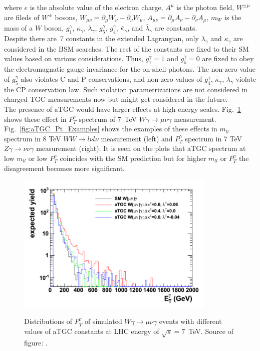 where $e$ is the absolute value of the electron charge, $A^\mu$ is the photon field, $W^{\pm\mu}$ are fileds of $W^\pm$ bosons, $W_{\mu\nu}=\partial_\mu W_\nu - \partial_\nu W_\mu$, $A_{\mu\nu}=\partial_\mu A_\nu - \partial_\nu A_\mu$, $m_W$ is the mass of a $W$ boson, $g_1^\gamma$, $\kappa_\gamma$, $\lambda_\gamma$, $g_5^\gamma$, $g_4^\gamma$, $\tilde{\kappa_\gamma}$, and $\tilde{\lambda_\gamma}$ are constants.\\

Despite there are~7 constants in the extended Lagrangian, only $\lambda_\gamma$ and $\kappa_\gamma$ are considered in the BSM searches. The rest of the constants are fixed to their SM values based on various considerations. Thus, $g_1^\gamma=1$ and $g_5^\gamma=0$ are fixed to obey the electromagnatic gauge invariance for the on-shell photons. The non-zero value of $g_5^\gamma$ also violates C and P conservations, and non-zero values of $g_4^\gamma$, $\tilde{\kappa_\gamma}$, $\tilde{\lambda_\gamma}$ violate the CP conservation law. Such violation parametrizations are not considered in charged TGC measurements now but might get considered in the future.\\

The presence of aTGC would have larger effects at high energy scales. Fig.~\ref{fig:aTGC_Pt_Wg} shows these effect in $P_T^\gamma$ spectrum of 7~TeV $W\gamma \rightarrow \mu\nu\gamma$ measurement. Fig.~\ref{fig:aTGC_Pt_Examples}  shows the examples of these effects in $m_{ll}$ spectrum in 8 TeV $WW \rightarrow l\nu l\nu$ measurement (left) and $P_T^{\gamma}$ spectrum in 7 TeV $Z\gamma \rightarrow \nu\nu\gamma$ measurement (right). It is seen on the plots that aTGC spectrum at low $m_{ll}$ or low $P_T^{\gamma}$ coincides with the SM prediction but for higher $m_{ll}$ or $P_T^{\gamma}$ the disagreement becomes more significant.\\

\begin{figure}[htb]
  \begin{center}
    {\includegraphics[width=0.85\textwidth]{../figs/WgAbout/aTGC_Pt_Wg.png}}
    \caption{Distributions of $P_T^\gamma$ of simulated $W\gamma\rightarrow\mu\nu\gamma$ events with different values of aTGC constants at LHC energy of $\sqrt{s}=7$~TeV. Source of figure:  \cite{ref_Senka_thesis}.}
    \label{fig:aTGC_Pt_Wg}
  \end{center}
\end{figure}

